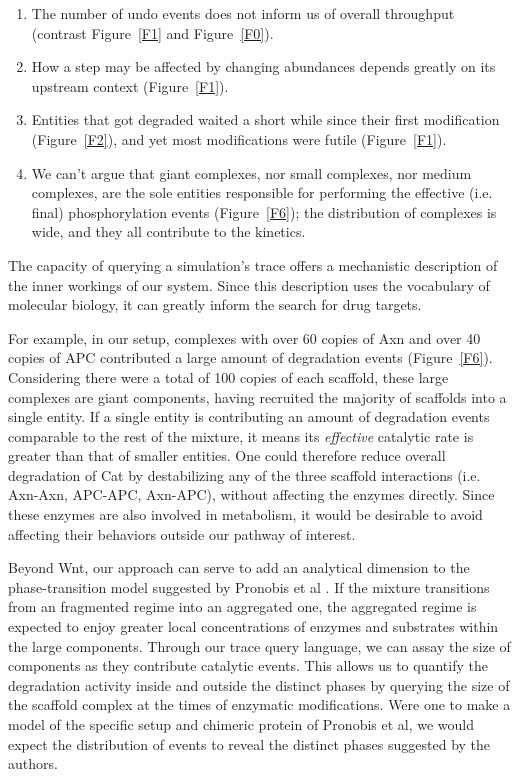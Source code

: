 \begin{enumerate}
\item The number of undo events does not inform us of overall
  throughput (contrast Figure~\ref{F1} and Figure~\ref{F0}).
\item How a step may be affected by changing abundances depends
  greatly on its upstream context (Figure~\ref{F1}).
\item Entities that got degraded waited a short while since their
  first modification (Figure~\ref{F2}), and yet most modifications
  were futile (Figure~\ref{F1}).
\item We can't argue that giant complexes, nor small complexes, nor
  medium complexes, are the sole entities responsible for performing
  the effective (i.e. final) phosphorylation events  (Figure~\ref{F6}); %
  the distribution of complexes is wide, and they all contribute to
  the kinetics.
\end{enumerate}

The capacity of querying a simulation's trace offers a mechanistic description of the inner workings of our system. Since this description uses the vocabulary of molecular biology, it can greatly inform the search for drug targets. 

For example, in our setup, complexes with over 60 copies of Axn and over 40 copies of APC contributed a large amount of degradation events (Figure~\ref{F6}). Considering there were a total of 100 copies of each scaffold, these large complexes are giant components, having recruited the majority of scaffolds into a single entity. If a single entity is contributing an amount of degradation events comparable to the rest of the mixture, it means its \emph{effective} catalytic rate is greater than that of smaller entities. One could therefore reduce overall degradation of Cat by destabilizing any of the three scaffold interactions (i.e. Axn-Axn, APC-APC, Axn-APC), without affecting the enzymes directly. Since these enzymes are also involved in metabolism, it would be desirable to avoid affecting their behaviors outside our pathway of interest.

\bigskip

Beyond Wnt, our approach can serve to add an analytical dimension to the phase-transition model suggested by Pronobis et al \cite{pronobis2017reconstituting}. If the mixture transitions from an fragmented regime into an aggregated one, the aggregated regime is expected to enjoy greater local concentrations of enzymes and substrates within the large components. Through our trace query language, we can assay the size of components as they contribute catalytic events. This allows us to quantify the degradation activity inside and outside the distinct phases by querying the size of the scaffold complex at the times of enzymatic modifications. Were one to make a model of the specific setup and chimeric protein of Pronobis et al, we would expect the distribution of events to reveal the distinct phases suggested by the authors.

